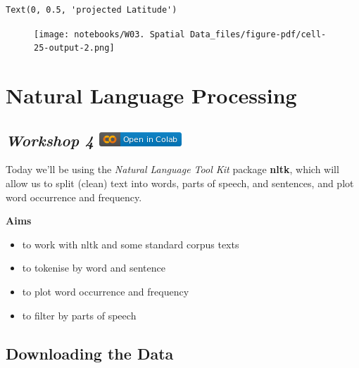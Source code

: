 \documentclass[
  letterpaper,
  DIV=11,
  numbers=noendperiod]{scrreprt}
\providecommand{\tightlist}{%
  \setlength{\itemsep}{0pt}\setlength{\parskip}{0pt}}\usepackage{longtable,booktabs,array}
\begin{document}
\begin{verbatim}
Text(0, 0.5, 'projected Latitude')
\end{verbatim}

\begin{figure}[H]

{\centering \texttt{[image: notebooks/W03. Spatial Data\_files/figure-pdf/cell-25-output-2.png]}

}

\end{figure}


\hypertarget{natural-language-processing}{%
\chapter{Natural Language
Processing}\label{natural-language-processing}}

\hypertarget{workshop-4-open-in-colab}{%
\section[\emph{Workshop 4} ]{\texorpdfstring{\emph{Workshop 4}
\href{https://colab.research.google.com/github/oballinger/QM2/blob/main/notebooks/W04.\%20Natural\%20Language\%20Processing.ipynb}{\protect\includegraphics{notebooks/../colab-badge.png}}}{Workshop 4 Open In Colab}}\label{workshop-4-open-in-colab}}

Today we'll be using the \emph{Natural Language Tool Kit} package
\textbf{nltk}, which will allow us to split (clean) text into words,
parts of speech, and sentences, and plot word occurrence and frequency.

\textbf{Aims}

\begin{itemize}
\tightlist
\item
  to work with nltk and some standard corpus texts
\item
  to tokenise by word and sentence
\item
  to plot word occurrence and frequency
\item
  to filter by parts of speech
\end{itemize}

\hypertarget{downloading-the-data-2}{%
\section{Downloading the Data}\label{downloading-the-data-2}}
\end{document}
